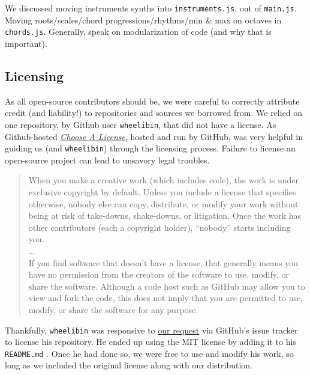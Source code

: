 \documentclass[12pt,a4paper]{article}
\newcommand{\code}{\texttt}
\newcommand{\lightcode}[1]{\colorbox{light-gray}{\texttt{#1}}}
\begin{document}
We discussed moving instruments synths into \lightcode{instruments.js}, out of \lightcode{main.js}. Moving roots/scales/chord progressions/rhythms/min \& max on octaves in \lightcode{chords.js}. Generally, speak on modularization of code (and why that is important).

\subsection{Licensing}

As all open-source contributors should be, we were careful to correctly attribute credit (and liability!) to repositories and sources we borrowed from. We relied on one repository, by Github user \code{wheelibin}, that did not have a license. As Github-hosted \href{https://choosealicense.com/}{\textit{Choose A License}}, hosted and run by GitHub, was very helpful in guiding us (and \code{wheelibin}) through the licensing process. Failure to license an open-source project can lead to unsavory legal troubles. 

\begin{quote}
When you make a creative work (which includes code), the work is under exclusive copyright by default. Unless you include a license that specifies otherwise, nobody else can copy, distribute, or modify your work without being at risk of take-downs, shake-downs, or litigation. Once the work has other contributors (each a copyright holder), “nobody” starts including you. \\
\dots \\
If you find software that doesn’t have a license, that generally means you have no permission from the creators of the software to use, modify, or share the software. Although a code host such as GitHub may allow you to view and fork the code, this does not imply that you are permitted to use, modify, or share the software for any purpose. \cite{choose-license-none}
\end{quote}


Thankfully, \code{wheelibin} was responsive to \href{https://github.com/wheelibin/synaesthesia/issues/2}{our request} via GitHub's issue tracker to license his repository. He ended up using the MIT license by adding it to his \lightcode{README.md} \cite{synaesthesia-license}. Once he had done so, we were free to use and modify his work, so long as we included the original license along with our distribution. 


\pagebreak
\end{document}
